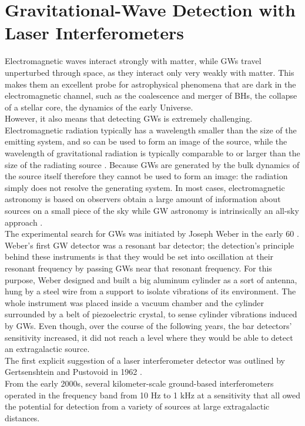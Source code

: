 \documentclass[binding=0.6cm, LaM]{sapthesis}
\begin{document}
\section{Gravitational-Wave Detection with Laser Interferometers}

	Electromagnetic waves interact strongly with matter, while GWs travel unperturbed through space,
        as they interact only very weakly with matter. This makes them an excellent probe for astrophysical phenomena that are dark
        in the electromagnetic channel, such as the coalescence and merger of BHs, the collapse of a stellar core,
  	the dynamics of the early Universe. \\
	However, it also means that detecting GWs is extremely challenging.
        Electromagnetic radiation typically has a wavelength smaller than the size of the emitting system,
        and so can be used to form an image of the source, while the wavelength of gravitational radiation is typically comparable
        to or larger than the size of the radiating source \cite{18}. 
        Because GWs are generated by the bulk dynamics of the source itself therefore they cannot be used to form an image:
        the radiation simply does not resolve the generating system.
        In most cases, electromagnetic astronomy is based on observers obtain a large amount of information about sources on a small piece
        of the sky while GW astronomy is intrinsically an all-sky approach \cite{4}. \\
	The experimental search for GWs was initiated by Joseph Weber in the early 60  \cite{7}.
	Weber’s first GW detector was a resonant bar detector; 
	the detection’s principle behind these instruments is that 
	they would be set into oscillation at their resonant frequency 
	by passing GWs near that resonant frequency.
	For this purpose, Weber designed and built a big aluminum cylinder as a sort of antenna, 
	hung by a steel wire from a support to isolate vibrations of its environment. 
	The whole instrument was placed inside a vacuum chamber 
	and the cylinder surrounded by a belt of piezoelectric crystal, 
	to sense cylinder vibrations induced by GWs.
	Even though, over the course of the following years, the bar detectors’ sensitivity increased, 
	it did not reach a level where they would be able to detect an extragalactic source. \\
	The first explicit suggestion of a laser interferometer detector 
	was outlined by Gertsenshtein and Pustovoid in 1962 \cite{8}. \\
	From the early 2000s, several kilometer-scale ground-based interferometers 
	operated in the frequency band from 10 Hz to 1 kHz at a sensitivity 
	that all owed the potential for detection from a variety 
	of sources at large extragalactic distances.
\end{document}
